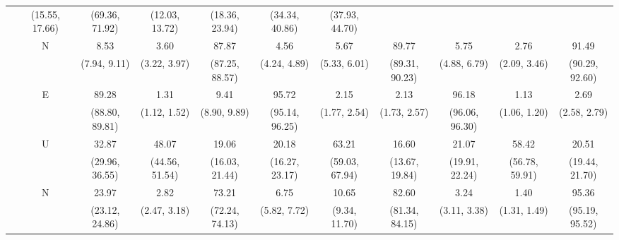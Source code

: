 {\begin{tabular}{>{\centering}m{}c|ccc|ccc|ccc}
& {\scriptsize (15.55, 17.66)} & {\scriptsize (69.36, 71.92)} & {\scriptsize (12.03, 13.72)}
& {\scriptsize (18.36, 23.94)} & {\scriptsize (34.34, 40.86)} & {\scriptsize (37.93, 44.70)}
\\ [0.1cm]
& \multirow{2}{*}{N}
& 8.53 & 3.60 & 87.87 & 4.56 & 5.67 & 89.77 & 5.75 & 2.76 & 91.49 \\ [-0.1cm] &
& {\scriptsize (7.94, 9.11)} & {\scriptsize (3.22, 3.97)} & {\scriptsize (87.25, 88.57)}
& {\scriptsize (4.24, 4.89)} & {\scriptsize (5.33, 6.01)} & {\scriptsize (89.31, 90.23)}
& {\scriptsize (4.88, 6.79)} & {\scriptsize (2.09, 3.46)} & {\scriptsize (90.29, 92.60)}
\\ [0.1cm]
\hline
\multirow{6}{0.1\textwidth}{\centering Husband Non-participant}
& \multirow{2}{*}{E}
& 89.28 & 1.31 & 9.41 & 95.72 & 2.15 & 2.13 & 96.18 & 1.13 & 2.69 \\ [-0.1cm] &
& {\scriptsize (88.80, 89.81)} & {\scriptsize (1.12, 1.52)} & {\scriptsize (8.90, 9.89)}
& {\scriptsize (95.14, 96.25)} & {\scriptsize (1.77, 2.54)} & {\scriptsize (1.73, 2.57)}
& {\scriptsize (96.06, 96.30)} & {\scriptsize (1.06, 1.20)} & {\scriptsize (2.58, 2.79)}
\\ [0.1cm]
& \multirow{2}{*}{U}
& 32.87 & 48.07 & 19.06 & 20.18 & 63.21 & 16.60 & 21.07 & 58.42 & 20.51 \\ [-0.1cm] &
& {\scriptsize (29.96, 36.55)} & {\scriptsize (44.56, 51.54)} & {\scriptsize (16.03, 21.44)}
& {\scriptsize (16.27, 23.17)} & {\scriptsize (59.03, 67.94)} & {\scriptsize (13.67, 19.84)}
& {\scriptsize (19.91, 22.24)} & {\scriptsize (56.78, 59.91)} & {\scriptsize (19.44, 21.70)}
\\ [0.1cm]
& \multirow{2}{*}{N}
& 23.97 & 2.82 & 73.21 & 6.75 & 10.65 & 82.60 & 3.24 & 1.40 & 95.36 \\ [-0.1cm] &
& {\scriptsize (23.12, 24.86)} & {\scriptsize (2.47, 3.18)} & {\scriptsize (72.24, 74.13)}
& {\scriptsize (5.82, 7.72)} & {\scriptsize (9.34, 11.70)} & {\scriptsize (81.34, 84.15)}
& {\scriptsize (3.11, 3.38)} & {\scriptsize (1.31, 1.49)} & {\scriptsize (95.19, 95.52)}
\\ [0.1cm]
\hline
\hline
\end{tabular}
}
